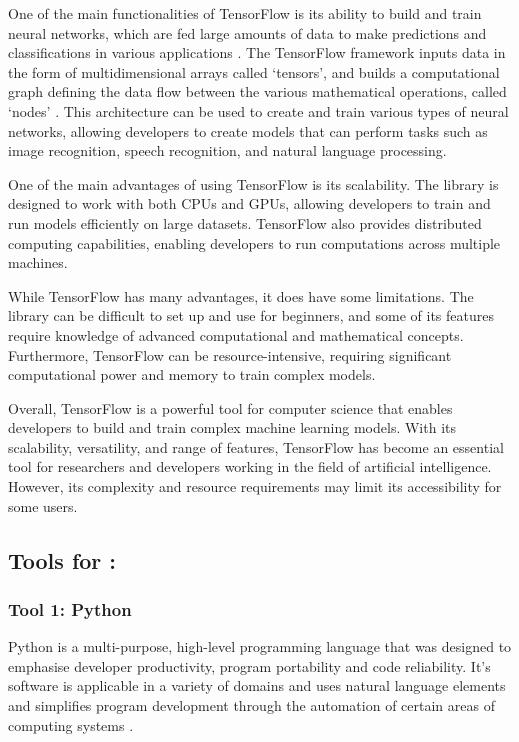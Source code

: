 \documentclass[a4paper, 11pt]{report}
\begin{document}
One of the main functionalities of TensorFlow is its ability to build and train neural networks, which are fed large amounts of data to make predictions and classifications in various applications \cite{ibm}. The TensorFlow framework inputs data in the form of multidimensional arrays called ‘tensors’, and builds a computational graph defining the data flow between the various mathematical operations, called ‘nodes’ \cite{simplilearn}. This architecture can be used to create and train various types of neural networks, allowing developers to create models that can perform tasks such as image recognition, speech recognition, and natural language processing.

One of the main advantages of using TensorFlow is its scalability. The library is designed to work with both CPUs and GPUs, allowing developers to train and run models efficiently on large datasets. TensorFlow also provides distributed computing capabilities, enabling developers to run computations across multiple machines.

While TensorFlow has many advantages, it does have some limitations. The library can be difficult to set up and use for beginners, and some of its features require knowledge of advanced computational and mathematical concepts. Furthermore, TensorFlow can be resource-intensive, requiring significant computational power and memory to train complex models.

Overall, TensorFlow is a powerful tool for computer science that enables developers to build and train complex machine learning models. With its scalability, versatility, and range of features, TensorFlow has become an essential tool for researchers and developers working in the field of artificial intelligence. However, its complexity and resource requirements may limit its accessibility for some users.

\subsection{Tools for \majB: \studB}

\subsubsection{Tool 1: Python}
Python is a multi-purpose, high-level programming language that was designed to emphasise developer productivity, program portability and code reliability. It's software is applicable in a variety of domains and uses natural language elements and simplifies program development through the automation of certain areas of computing systems \cite{geek}.
\end{document}
